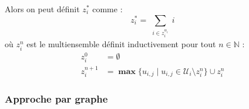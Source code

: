 \documentclass[a4paper, titlepage, oneside, 12pt]{article}%
\newcommand\boldmax{\mathop{\mathbf{max}}}
\begin{document}
Alors on peut définit $z_i^*$ comme :
$$z_i^*=\sum_{\substack{i \in z_i^{\alpha_i}}} i$$ 
où $z_i^{n}$ est le multiensemble définit inductivement pour tout $n\in \mathbb{N}$ : 
\begin{align*}
z_i^0 &= \emptyset \\
z_i^{n+1} &= \boldmax \{u_{i,j} \mid u_{i,j} \in \mathcal{U}_i \setminus z_i^{n} \} \cup z_i^{n} 
\end{align*} 
\subsubsection{Approche par graphe}
\end{document}

